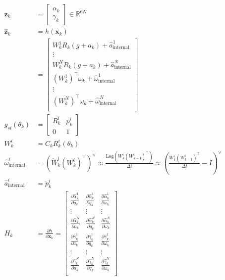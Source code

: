 \documentclass[11pt]{article}
\newcommand{\pd}[2]{\frac{\partial #1}{\partial #2}} %
\begin{document}
\begin{align*}
    \mathbf{z}_k &= \begin{bmatrix}
        \alpha_k \\ \gamma_k
    \end{bmatrix} \in \mathbb{R}^{6N} \\
    \hat{\mathbf{z}}_k &= h(\mathbf{x}_k) \\
    &= \begin{bmatrix}
        W_k^1 R_k (g + a_k) + \hat{a}^1_{\text{internal}} \\
        \vdots \\
        W_k^N R_k (g + a_k) + \hat{a}^N_{\text{internal}} \\
        (W_k^1)^\top \omega_k + \hat{\omega}^1_{\text{internal}} \\
        \vdots \\
        (W_k^N)^\top \omega_k + \hat{\omega}^N_{\text{internal}} \\
    \end{bmatrix} \\
    g_{si}(\theta_k) &= \begin{bmatrix}
        R_k^i & p_k^i \\
        0 & 1
    \end{bmatrix} \\
    W_k^i &= C_k R_k^i(\theta_k) \\
    \hat{\omega}^i_{\text{internal}} &= \left(\dot{W}^i_k(W_k^i)^\top\right)^\vee \approx \frac{\text{Log}\left(W_k^i(W_{k-1}^i)^\top\right)}{\Delta t} \approx \left(\frac{W_k^i(W_{k-1}^i)^\top}{\Delta t} - I\right)^\vee \\
    \hat{a}^i_{\text{internal}} &= \ddot{p}_k^i \\
    H_k &= \pd{h}{\mathbf{x}_k} = \begin{bmatrix}
        \pd{\hat{\alpha}^1_k}{a_k} & \pd{\hat{\alpha}^1_k}{q_k} & \pd{\hat{\alpha}^1_k}{\omega_k} \\
        \vdots & \vdots & \vdots \\
        \pd{\hat{\alpha}^N_k}{a_k} & \pd{\hat{\alpha}^N_k}{q_k} & \pd{\hat{\alpha}^N_k}{\omega_k} \\
        \pd{\hat{\gamma}^1_k}{a_k} & \pd{\hat{\gamma}^1_k}{q_k} & \pd{\hat{\gamma}^1_k}{\omega_k} \\
        \vdots & \vdots & \vdots \\
        \pd{\hat{\gamma}^N_k}{a_k} & \pd{\hat{\gamma}^N_k}{q_k} & \pd{\hat{\gamma}^N_k}{\omega_k} \\

\end{bmatrix}
\end{align*}
\end{document}
